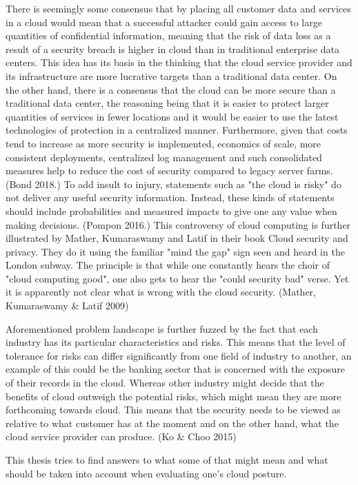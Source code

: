 \documentclass{article}
\begin{document}
There is seemingly some consensus that by placing all customer data and services in a cloud would mean that a successful attacker could gain access to large quantities of confidential information, meaning that the risk of data loss as a result of a security breach is higher in cloud than in traditional enterprise data centers. This idea has its basis in the thinking that the cloud service provider and its infrastructure are more lucrative targets than a traditional data center. On the other hand, there is a consensus that the cloud can be more secure than a traditional data center, the reasoning being that it is easier to protect larger quantities of services in fewer locations and it would be easier to use the latest technologies of protection in a centralized manner. Furthermore, given that costs tend to increase as more security is implemented, economics of scale, more consistent deployments, centralized log management and such consolidated measures help to reduce the cost of security compared to legacy server farms. (Bond 2018.) To add insult to injury, statements such as "the cloud is risky" do not deliver any useful security information. Instead, these kinds of statements should include probabilities and measured impacts to give one any value when making decisions. (Pompon 2016.) 
This controversy of cloud computing is further illustrated by Mather, Kumaraswamy and Latif in their book Cloud security and privacy. They do it using the familiar "mind the gap" sign seen and heard in the London subway. The principle is that while one constantly hears the choir of "cloud computing good", one also gets to hear the "could security bad" verse. Yet it is apparently not clear what is wrong with the cloud security. (Mather, Kumaraswamy \& Latif 2009)
\par
Aforementioned problem landscape is further fuzzed by the fact that each industry has its particular characteristics and risks. This means that the level of tolerance for risks can differ significantly from one field of industry to another, an example of this could be the banking sector that is concerned with the exposure of their records in the cloud. Whereas other industry might decide that the benefits of cloud outweigh the potential risks, which might mean they are more forthcoming towards cloud. This means that the security needs to be viewed as relative to what customer has at the moment and on the other hand, what the cloud service provider can produce. (Ko \& Choo 2015)
\par
This thesis tries to find answers to what some of that might mean and what should be taken into account when evaluating one's cloud posture.
\end{document}
